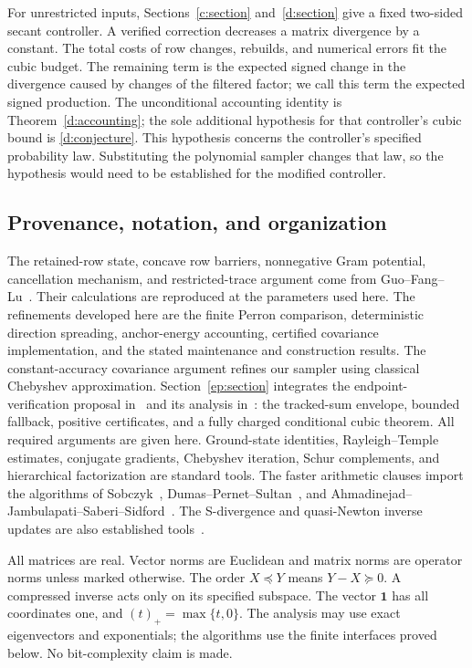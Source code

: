 \documentclass[11pt]{amsart}
\theoremstyle{definition}\newtheorem{definition}[theorem]{Definition}
\theoremstyle{remark}\newtheorem{remark}[theorem]{Remark}
\numberwithin{equation}{section}
\newcommand{\one}{\mathbf1}
\begin{document}
For unrestricted inputs, Sections~\ref{c:section} and~\ref{d:section}
give a fixed two-sided secant controller. A verified correction decreases
a matrix divergence by a constant. The total costs of row changes, rebuilds, and numerical
errors fit the cubic budget. The remaining term is the expected signed
change in the divergence caused by changes of the filtered factor;
we call this term the expected signed production.
The unconditional accounting identity is Theorem~\ref{d:accounting};
the sole additional hypothesis for that controller's cubic bound is
\eqref{d:conjecture}. This hypothesis concerns the controller's specified probability law.
Substituting the polynomial sampler changes that law, so the hypothesis
would need to be established for the modified controller.

\subsection{Provenance, notation, and organization}
The retained-row state, concave row barriers, nonnegative Gram potential,
cancellation mechanism, and restricted-trace argument come from
Guo--Fang--Lu~\cite{GFL}. Their calculations are reproduced at the parameters
used here. The refinements developed here are the finite Perron comparison,
deterministic direction spreading, anchor-energy accounting, certified
covariance implementation, and the stated maintenance and construction
results. The constant-accuracy covariance argument refines our sampler using
classical Chebyshev approximation. Section~\ref{ep:section} integrates
the endpoint-verification proposal in~\cite{CertSteps} and its analysis
in~\cite{CertAnalysis}: the tracked-sum envelope, bounded fallback,
positive certificates, and a fully charged conditional cubic theorem.
All required arguments are given here.
Ground-state identities, Rayleigh--Temple estimates, conjugate gradients,
Chebyshev iteration, Schur complements, and hierarchical factorization are
standard tools. The faster arithmetic clauses import the algorithms of
Sobczyk~\cite{Sob}, Dumas--Pernet--Sultan~\cite{DPS}, and
Ahmadinejad--Jambulapati--Saberi--Sidford~\cite{AJSS}.
The S-divergence and quasi-Newton inverse updates are also established
tools~\cite{Sra,Gower,GR16}.

All matrices are real. Vector norms are Euclidean and matrix norms are
operator norms unless marked otherwise. The order $X\preceq Y$ means
$Y-X\succeq0$. A compressed inverse acts only on its specified subspace.
The vector $\one$ has all coordinates one, and $(t)_+=\max\{t,0\}$.
The analysis may use exact eigenvectors and exponentials; the algorithms
use the finite interfaces proved below. No bit-complexity claim is made.
\end{document}
